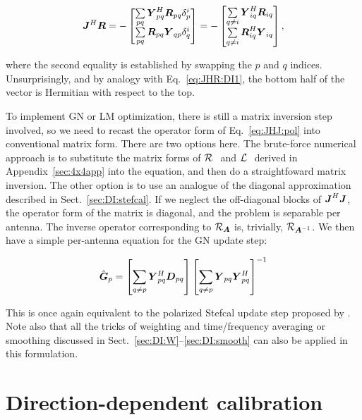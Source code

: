 \documentclass[useAMS,usenatbib]{mn2e}
\newcommand{\mat}[1]{{\bmath{#1}}}
\newcommand{\JJ}{\mat{J}} %
\newcommand{\DD}{\mat{D}}
\newcommand{\RR}{\mat{R}}
\newcommand{\GG}{\mat{G}}
\newcommand{\JHJ}{\JJ^H\JJ} %
\begin{document}
\begin{equation}
\JJ^H\bmath{R} = -\Matrix{c}{ 
\sum\limits_{pq} \YY^H_{pq} \RR_{pq} \delta^{i}_p  \\
\sum\limits_{pq} \RR_{pq} \YY_{qp} \delta^{i}_q 
} = -\Matrix{c}{
\sum\limits_{q\ne i} \YY^H_{iq} \RR_{iq} \\
\sum\limits_{q\ne i} \RR^H_{iq} \YY_{iq}  
},
\end{equation}

where the second equality is established by swapping the $p$ and $q$ indices. Unsurprisingly, and by analogy with 
Eq.~\ref{eq:JHR:DI1}, the bottom half of the vector is Hermitian with respect to the top.

To implement GN or LM optimization, there is still a matrix inversion step involved, so we need to recast the operator 
form of Eq.~\ref{eq:JHJ:pol} into conventional matrix form. There are two options here. The brute-force numerical
approach is to substitute the matrix forms of $\mathcal{R}_{{~}}$ and $\mathcal{L}_{{~}}$ derived in Appendix~\ref{sec:4x4app} into the equation, 
and then do a straightfoward matrix inversion. The other option is to use an analogue of the diagonal approximation described in 
Sect.~\ref{sec:DI:stefcal}. If we neglect the off-diagonal blocks of $\JHJ$, the operator form of the matrix is 
diagonal, and the problem is separable per antenna. The inverse operator corresponding to $\Rop{\mat{A}}$ is, 
trivially, $\Rop{\mat{A}^{-1}}$. We then have a simple per-antenna equation for the GN update step:

\begin{equation}
\label{eq:update:DI:diag:pol}
\hat{\GG}_p = \left [ \sum\limits_{q\ne p} \YY^H_{pq} \DD_{pq} \right ] 
\left [ \sum\limits_{q\ne p} \YY_{pq} \YY^H_{pq}  \right ]^{-1}
\end{equation}

This is once again equivalent to the polarized Stefcal update step proposed by \citet{Stefcal}. Note also that all 
the tricks of weighting and time/frequency averaging or smoothing discussed in Sect.~\ref{sec:DI:W}--\ref{sec:DI:smooth} 
can also be applied in this formulation.


\section{Direction-dependent calibration}

\newcommand{\Ns}{N_s}
\end{document}
